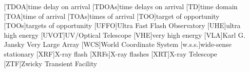 \begin{acronym}
[TDOA]{time delay on arrival}
[TDOAs]{time delays on arrival}
[TD]{time domain}
[TOA]{time of arrival}
[TOAs]{times of arrival}
[TOO]{target of opportunity}
[TOOs]{targets of opportunity}
[UFFO]{Ultra Fast Flash Observatory}
[UHE]{ultra high energy}
[UVOT]{UV/Optical Telescope}
[VHE]{very high energy}
[VLA]{Karl G. Jansky Very Large Array}
[WCS]{World Coordinate System}
[w.s.s.]{wide\nobreakdashes-sense stationary}
[XRF]{X\nobreakdashes-ray flash}
[XRFs]{X\nobreakdashes-ray flashes}
[XRT]{X\nobreakdashes-ray Telescope}
[ZTF]{Zwicky Transient Facility}
\end{acronym}
